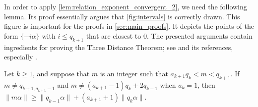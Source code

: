 \documentclass[a4paper,fleqn]{article}
\providecommand{\norm}[1]{\lVert#1\rVert}
\begin{document}
  In order to apply \autoref{lem:relation_exponent_convergent_2}, we need the following lemma. Its proof essentially
  argues that \autoref{fig:intervals} is correctly drawn. This figure is important for the proofs in
  \autoref{sec:main_proofs}. It depicts the points of the form $\{-i\alpha\}$ with $i \leq q_{k+1}$ that are closest to
  $0$. The presented arguments contain ingredients for proving the Three Distance Theorem; see
  \cite{1998:three_distance_theorems_and_combinatorics_on_words} and its references, especially
  \cite{1988:the_three_gap_theorem_steinhaus_conjecture}.

  \begin{lemma}\label{lem:larger_lower_bound}
    Let $k \geq 1$, and suppose that $m$ is an integer such that $a_{k+1}q_k < m < q_{k+1}$. If
    $m \neq q_{k+1,a_{k+1}-1}$ and $m \neq (a_{k+1}-1)q_k + 2q_{k-1}$ when $a_k = 1$, then
    $\norm{m\alpha} \geq \norm{q_{k-1}\alpha} + (a_{k+1} + 1)\norm{q_k\alpha}$.
  \end{lemma}
\end{document}
